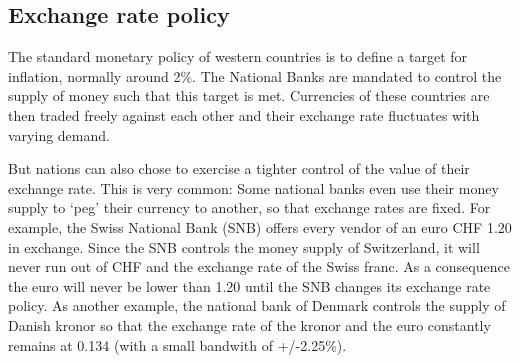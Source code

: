 \documentclass[11pt]{article}
\begin{document}


\subsection{Exchange rate policy}


The standard monetary policy of western countries is to define a target for inflation, normally around 2\%. The National Banks are mandated to control the supply of money such that this target is met. Currencies of these countries are then traded freely against each other and their exchange rate fluctuates with varying demand. 

But nations can also chose to exercise a tighter control of the value of their 
exchange rate. 
This is very common: Some national banks even use their money 
supply to `peg' their currency to another, so that exchange rates are 
fixed.  For example, the Swiss National Bank (SNB) offers every vendor 
of an euro CHF 1.20 in exchange.  Since the SNB controls the money 
supply of Switzerland, it will never run out of CHF and the exchange 
rate of the Swiss franc. As a consequence the euro will never be lower 
than 1.20 until the SNB changes its exchange rate policy.  As another 
example, the national bank of Denmark controls the supply of Danish 
kronor so that the exchange rate of the kronor and the euro constantly 
remains at 0.134 (with a small bandwith of +/-2.25\%).
\end{document}
